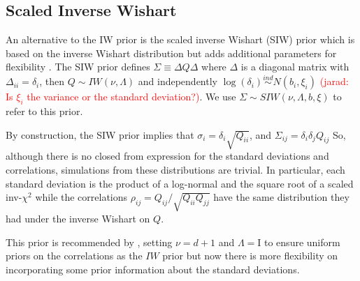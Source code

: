 \documentclass[a4paper]{article}
\newcommand{\jarad}[1]{\textcolor{red}{(jarad: #1)}}
\newcommand{\I}{\mathrm{I}}
\begin{document}
\subsection{Scaled Inverse Wishart \label{sec:siw}}

An alternative to the IW prior is the scaled inverse Wishart (SIW) prior which is based on the inverse Wishart distribution but adds additional parameters for flexibility \citep{odomain}. The SIW prior defines $\Sigma \equiv \Delta Q \Delta $ where $\Delta$ is a diagonal matrix with $\Delta_{ii}=\delta_i$, then $Q \sim  IW(\nu, \Lambda)$ and independently $\log(\delta_i) \stackrel{ind} \sim N(b_i, \xi_i)$ \jarad{Is $\xi_i$ the variance or the standard deviation?}.  We use $\Sigma \sim SIW(\nu, \Lambda, b, \xi)$ to refer to this prior. 

By construction, the SIW prior implies that $\sigma_i = \delta_i \sqrt{Q_{ii}}$, and $\Sigma_{ij}=\delta_i\delta_jQ_{ij}$ So, although there is no closed from expression for the standard deviations and correlations, simulations from these distributions are trivial. In particular, each standard deviation is the product of a log-normal and the square root of a scaled inv-$\chi^2$ while the correlations $\rho_{ij} = Q_{ij}/\sqrt{Q_{ii}Q_{jj}}$ have the same distribution they had under the inverse Wishart on $Q$.  

This prior is recommended by \cite{gelmanhill}, setting $\nu=d+1$ and $\Lambda=\I$ to ensure uniform priors on the correlations as the $IW$ prior but now there is more flexibility on incorporating some prior information about the standard deviations.
\end{document}

